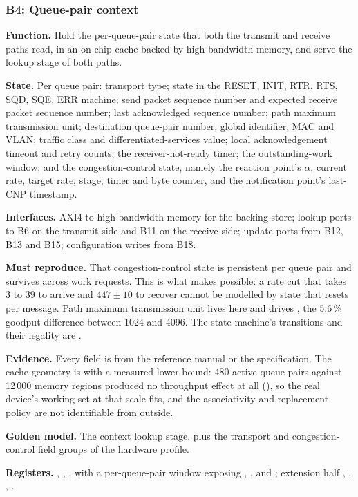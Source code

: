 \subsubsection{B4: Queue-pair context}

\textbf{Function.} Hold the per-queue-pair state that both the transmit and
receive paths read, in an on-chip cache backed by high-bandwidth memory, and
serve the lookup stage of both paths.

\textbf{State.} Per queue pair: transport type; state in the RESET, INIT, RTR,
RTS, SQD, SQE, ERR machine; send packet sequence number and expected receive
packet sequence number; last acknowledged sequence number; path maximum
transmission unit; destination queue-pair number, global identifier, MAC and
VLAN; traffic class and differentiated-services value; local acknowledgement
timeout and retry counts; the receiver-not-ready timer; the outstanding-work
window; and the congestion-control state, namely the reaction point's $\alpha$,
current rate, target rate, stage, timer and byte counter, and the notification
point's last-CNP timestamp.

\textbf{Interfaces.} AXI4 to high-bandwidth memory for the backing store;
lookup ports to B6 on the transmit side and B11 on the receive side; update
ports from B12, B13 and B15; configuration writes from B18.

\textbf{Must reproduce.} That congestion-control state is persistent per queue
pair and survives across work requests. This is what makes  possible:
a rate cut that takes 3 to 39\mS{} to arrive and $447 \pm 10$\mS{} to recover
cannot be modelled by state that resets per message. Path maximum transmission
unit lives here and drives , the 5.6\,\% goodput difference between
1024 and 4096. The state machine's transitions and their legality are
\evdoc{}.

\textbf{Evidence.} Every field is \evdoc{} from the reference manual or the
specification. The cache geometry is \evcal{} with a measured lower bound: 480
active queue pairs against 12\,000 memory regions produced no throughput effect
at all (), so the real device's working set at that scale fits, and
the associativity and replacement policy are not identifiable from outside.

\textbf{Golden model.} The context lookup stage, plus the transport and
congestion-control field groups of the hardware profile.

{\raggedright
\textbf{Registers.} , ,
,  with a per-queue-pair window exposing
, ,  and
; extension half ,
, , .\par}

